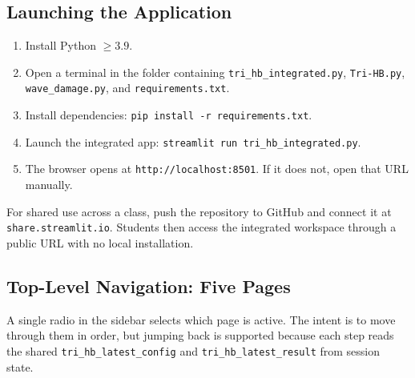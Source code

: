 \documentclass[11pt,a4paper]{article}
\begin{document}
\subsection{Launching the Application}

\begin{stepbox}
\begin{enumerate}[leftmargin=*, itemsep=3pt]
  \item Install Python $\geq 3.9$.
  \item Open a terminal in the folder containing \texttt{tri\_hb\_integrated.py},
        \texttt{Tri-HB.py}, \texttt{wave\_damage.py}, and
        \texttt{requirements.txt}.
  \item Install dependencies: \texttt{pip install -r requirements.txt}.
  \item Launch the integrated app: \texttt{streamlit run tri\_hb\_integrated.py}.
  \item The browser opens at \texttt{http://localhost:8501}. If it does not,
        open that URL manually.
\end{enumerate}
\end{stepbox}

For shared use across a class, push the repository to GitHub and connect it at
\texttt{share.streamlit.io}. Students then access the integrated workspace
through a public URL with no local installation.

\subsection{Top-Level Navigation: Five Pages}

A single radio in the sidebar selects which page is active. The intent is to
move through them in order, but jumping back is supported because each step
reads the shared \texttt{tri\_hb\_latest\_config} and
\texttt{tri\_hb\_latest\_result} from session state.
\end{document}
